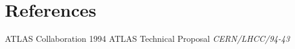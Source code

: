 \documentclass[a4paper]{jpconf}
\begin{document}

\section*{References}
\begin{thebibliography}{99}


\item ATLAS Collaboration 1994 ATLAS Technical Proposal 
      {\it CERN/LHCC/94-43} 

\end{thebibliography}

~

\end{document}
